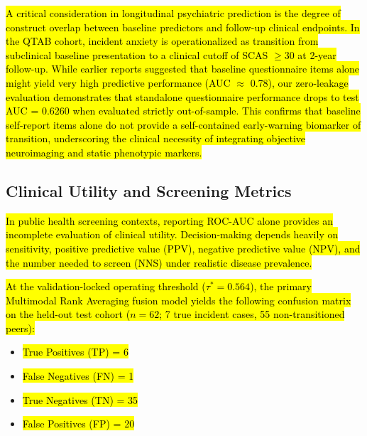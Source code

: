 \documentclass[10pt,letterpaper]{article}
\begin{document}
\hl{A critical consideration in longitudinal psychiatric prediction is the degree of construct overlap between baseline predictors and follow-up clinical endpoints. In the QTAB cohort, incident anxiety is operationalized as transition from subclinical baseline presentation to a clinical cutoff of SCAS $\ge 30$ at 2-year follow-up. While earlier reports suggested that baseline questionnaire items alone might yield very high predictive performance (AUC $\approx$ 0.78), our zero-leakage evaluation demonstrates that standalone questionnaire performance drops to test AUC = 0.6260 when evaluated strictly out-of-sample. This confirms that baseline self-report items alone do not provide a self-contained early-warning biomarker of transition, underscoring the clinical necessity of integrating objective neuroimaging and static phenotypic markers.}

\subsection*{Clinical Utility and Screening Metrics}

\hl{In public health screening contexts, reporting ROC-AUC alone provides an incomplete evaluation of clinical utility. Decision-making depends heavily on sensitivity, positive predictive value (PPV), negative predictive value (NPV), and the number needed to screen (NNS) under realistic disease prevalence.}

\hl{At the validation-locked operating threshold ($\tau^* = 0.564$), the primary Multimodal Rank Averaging fusion model yields the following confusion matrix on the held-out test cohort ($n=62$; 7 true incident cases, 55 non-transitioned peers):}
\begin{itemize}
    \item \hl{True Positives (TP) = 6}
    \item \hl{False Negatives (FN) = 1}
    \item \hl{True Negatives (TN) = 35}
    \item \hl{False Positives (FP) = 20}
\end{itemize}
\end{document}
